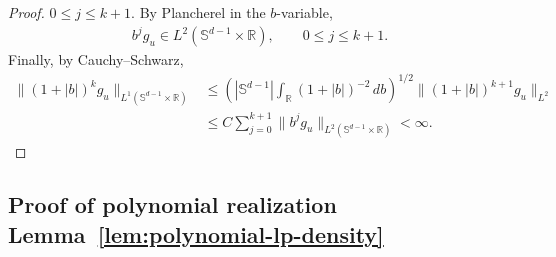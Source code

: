 \documentclass[12pt]{article}
\numberwithin{equation}{section}
\numberwithin{figure}{section}
\numberwithin{equation}{section}
\newcommand{\R}{\mathbb{R}}
\newcommand{\Sph}{\mathbb S}
\newcommand{\abs}[1]{\left|#1\right|}
\begin{document}
\begin{proof}
$0\le j\le k+1$. By Plancherel in the $b$-variable,
\begin{align*}
    b^j g_u\in L^2(\Sph^{d-1}\times\R),
    \qquad 0\le j\le k+1.
\end{align*}
Finally, by Cauchy--Schwarz,
\begin{align*}
    \|(1+|b|)^k g_u\|_{L^1(\Sph^{d-1}\times\R)}
    &\le
    \left(
        \abs{\Sph^{d-1}}
        \int_\R (1+|b|)^{-2}\,db
    \right)^{1/2}
    \|(1+|b|)^{k+1}g_u\|_{L^2}  \\
    &\le
    C\sum_{j=0}^{k+1}
    \|b^j g_u\|_{L^2(\Sph^{d-1}\times\R)}
    <\infty .
\end{align*}
\end{proof}


\subsection{Proof of polynomial realization Lemma~\ref{lem:polynomial-lp-density}}
\label{app:proof-poly-realization}
\end{document}
